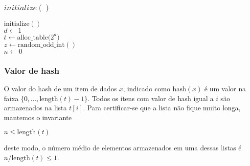 \documentclass{beamer}
\begin{document}
\begin{frame}
\frametitle{$initialize()$}
\begin{oframed}
\begin{flushleft}
\hspace*{1em} \ensuremath{\mathrm{initialize}()}\\
\hspace*{1em} \hspace*{1em} \ensuremath{d \gets  1}\\
\hspace*{1em} \hspace*{1em} \ensuremath{t \gets  \ensuremath{\mathrm{alloc\_table}(2^{d}})}\\
\hspace*{1em} \hspace*{1em} \ensuremath{z \gets  \ensuremath{\mathrm{random\_odd\_int}()}}\\
\hspace*{1em} \hspace*{1em} \ensuremath{n \gets  0}\\
\end{flushleft}
\end{oframed}

\end{frame}

\begin{frame}
\frametitle{Valor de hash}
O valor do hash de um item de dados $ \ensuremath{x}$, indicado como $ \ensuremath{\mathrm{hash}(x)}$ é um valor na faixa $ \{0,\ldots,\ensuremath{\ensuremath{\mathrm{length}(t)}}-1\}$. Todos os itens com valor de hash igual a $ \ensuremath{i}$ são armazenados na lista $ \ensuremath{t[i]}$. Para certificar-se que a lista não fique muito longa, mantemos o invariante

$\displaystyle \ensuremath{\ensuremath{n}} \le \ensuremath{\ensuremath{\mathrm{length}(t)}} $

deste modo, o número médio de elementos armazenados em uma dessas listas é $ \ensuremath{\ensuremath{n}}/\ensuremath{\ensuremath{\mathrm{length}(t)}} \le 1$. 
\end{frame}
\end{document}
